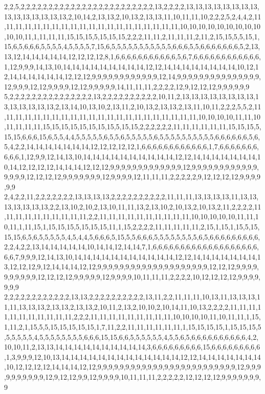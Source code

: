 2,2,5,2,2,2,2,2,2,2,2,2,2,2,2,2,2,2,2,2,2,2,2,2,2,2,2,13,2,2,2,2,13,13,13,13,13,13,13,13,13,13,13,13,13,13,13,2,10,14,2,13,13,2,10,13,2,13,13,11,10,11,11,10,2,2,2,5,2,4,4,2,11,11,11,11,11,11,11,11,11,11,11,11,11,11,11,11,11,11,11,11,10,10,10,10,10,10,10,10,10,10,10,11,1,11,11,11,15,15,15,5,15,15,15,2,2,2,11,11,2,11,11,11,2,11,2,15,15,5,5,15,1,15,6,5,6,6,6,5,5,5,5,4,5,5,5,5,7,15,6,5,5,5,5,5,5,5,5,5,5,5,6,6,6,5,5,6,6,6,6,6,6,6,5,2,13,13,12,14,14,14,14,14,12,12,12,12,8,1,6,6,6,6,6,6,6,6,6,6,6,5,6,7,6,6,6,6,6,6,6,6,6,6,6,6,1,12,9,9,9,14,13,10,14,14,14,14,14,14,14,14,14,12,12,14,14,14,14,14,14,14,14,10,12,12,14,14,14,14,14,14,12,12,12,9,9,9,9,9,9,9,9,9,9,9,9,12,14,9,9,9,9,9,9,9,9,9,9,9,9,9,9,9,12,9,9,9,12,12,9,9,9,9,12,12,9,9,9,9,9,14,11,11,11,2,2,2,2,12,9,12,12,12,9,9,9,9,9,9
5,2,2,2,2,2,2,2,2,2,2,2,2,2,2,2,13,2,2,2,2,2,2,2,2,2,2,10,11,2,13,13,13,13,13,13,13,13,13,13,13,13,13,13,2,13,14,10,13,10,2,13,11,2,10,13,2,13,13,2,13,11,10,11,2,2,2,5,5,2,11,11,11,11,11,11,11,11,11,11,11,11,11,11,11,11,11,11,11,11,11,11,10,10,10,10,11,11,10,11,11,11,11,15,15,15,15,15,15,15,15,5,15,15,2,2,2,2,2,2,11,11,11,11,11,11,15,15,15,5,15,15,6,6,6,15,6,5,5,4,4,5,5,5,5,5,6,5,5,6,5,5,5,5,5,6,5,5,5,5,5,5,5,5,5,5,6,6,6,6,6,6,5,6,5,4,2,2,14,14,14,14,14,14,14,12,12,12,12,12,1,6,6,6,6,6,6,6,6,6,6,6,6,1,7,6,6,6,6,6,6,6,6,6,6,1,12,9,9,12,14,13,10,14,14,14,14,14,14,14,14,14,14,12,12,14,14,14,14,14,14,14,10,14,12,12,12,12,14,14,14,12,12,12,9,9,9,9,9,9,9,9,9,9,9,9,9,12,9,9,9,9,9,9,9,9,9,9,9,9,9,9,9,9,12,12,12,12,9,9,9,9,9,9,9,12,9,9,9,9,12,11,11,11,2,2,2,2,2,9,12,12,12,12,9,9,9,9,9,9
2,4,2,2,11,2,2,2,2,2,2,2,13,13,13,13,2,2,2,2,2,2,2,2,2,2,11,11,11,13,13,13,13,11,13,13,13,13,13,13,13,2,2,13,10,2,10,2,13,10,11,11,13,2,13,10,2,10,13,2,10,13,2,11,2,2,2,2,11,11,11,11,11,11,11,11,11,11,2,2,11,11,11,11,11,11,11,11,11,11,10,10,10,10,10,11,11,10,11,1,11,15,1,15,15,15,5,15,15,15,11,1,15,2,2,2,2,11,11,11,11,11,2,15,1,15,1,15,5,15,15,15,6,5,6,5,5,5,5,5,4,5,4,4,5,6,6,6,5,15,5,5,6,6,6,5,5,5,5,5,5,5,5,6,5,6,6,6,6,6,6,6,6,6,2,2,4,2,2,13,14,14,14,14,14,10,14,14,12,14,14,7,1,6,6,6,6,6,6,6,6,6,6,6,6,6,6,6,6,6,6,6,6,6,7,9,9,9,12,14,13,10,14,14,14,14,14,14,14,14,14,14,14,12,12,14,14,14,14,14,14,14,13,12,12,12,9,12,14,14,14,12,12,9,9,9,9,9,9,9,9,9,9,9,9,9,9,9,9,9,9,9,9,12,12,12,9,9,9,9,9,9,9,9,9,9,12,12,12,12,9,9,9,9,9,12,9,9,9,9,10,11,11,11,2,2,2,2,10,12,12,12,12,9,9,9,9,9,9,9
2,2,2,2,2,2,2,2,2,2,2,2,13,13,2,2,2,2,2,2,2,2,2,2,13,11,2,2,11,11,11,10,13,11,13,13,13,11,11,13,13,13,2,13,13,2,13,13,2,10,11,2,13,2,10,10,2,10,14,11,10,13,2,2,2,2,11,11,11,11,11,11,11,11,11,11,11,2,2,2,11,11,11,11,11,11,11,11,11,10,10,10,10,11,10,11,11,1,15,1,11,2,1,15,5,5,15,15,15,15,15,1,7,11,2,2,11,11,11,11,11,11,1,15,15,15,15,1,15,15,15,5,5,5,5,5,5,4,5,5,5,5,5,5,5,5,6,6,6,15,15,6,6,5,5,5,5,5,5,4,5,5,6,5,6,6,6,6,6,6,6,6,6,6,4,2,10,10,11,2,13,13,14,14,14,14,14,14,14,14,14,14,3,6,6,6,6,6,6,6,6,6,15,6,6,6,6,6,6,6,6,6,1,3,9,9,9,12,10,13,14,14,14,14,14,14,14,14,14,14,14,14,14,12,12,14,14,14,14,14,14,14,10,12,12,12,12,14,14,14,12,12,9,9,9,9,9,9,9,9,9,9,9,9,9,9,9,9,9,9,9,9,9,9,9,9,9,12,9,9,9,9,9,9,9,9,9,9,12,9,12,12,9,9,12,9,9,9,9,10,11,11,11,2,2,2,2,2,12,12,12,12,9,9,9,9,9,9,9,9
